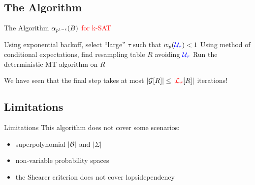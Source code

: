 \documentclass{beamer}
\def\spadding{\vspace{0.25cm}}
\def\r{\textcolor{red}}
\begin{document}
\subsection{The Algorithm}
\begin{frame}{The Algorithm}
\r{$\alpha_{p^{1-\epsilon}}(B)$ for k-SAT}\pause

\begin{algorithm}[H]
\pause
Using exponential backoff, select ``large'' $\tau$ such that $w_p(\textcolor{blue}{\mathcal{U}_\tau}) < 1$\;\pause
Using method of conditional expectations, find resampling table $R$ avoiding $\textcolor{blue}{\mathcal{U}_\tau}$\;\pause
Run the deterministic MT algorithm on $R$\;
\end{algorithm}\pause\spadding

We have seen that the final step takes at most $|\compat{\G}{R}| \leq |\compat{\L}{R}|$ iterations!
\end{frame}

\subsection{Limitations}
\begin{frame}{Limitations}
This algorithm does not cover some scenarios:
\begin{itemize}
    \item superpolynomial $|\mathcal{B}|$ and $|\Sigma|$\pause
    \item non-variable probability spaces\pause
    \item the Shearer criterion does not cover lopsidependency
\end{itemize}
\end{frame}

    
    
\end{document}
